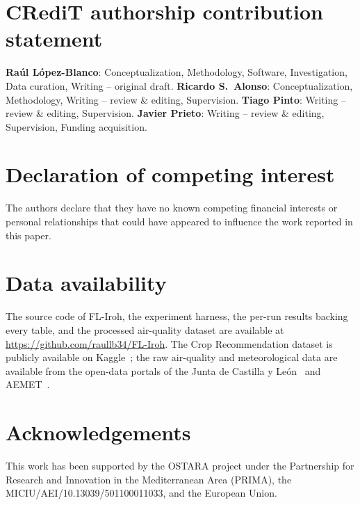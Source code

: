 \documentclass[a4paper,fleqn]{cas-dc}
\begin{document}
\section*{CRediT authorship contribution statement}
\textbf{Ra\'ul L\'opez-Blanco}: Conceptualization, Methodology, Software, Investigation, Data curation, Writing -- original draft. \textbf{Ricardo S.~Alonso}: Conceptualization, Methodology, Writing -- review \& editing, Supervision. \textbf{Tiago Pinto}: Writing -- review \& editing, Supervision. \textbf{Javier Prieto}: Writing -- review \& editing, Supervision, Funding acquisition.

\section*{Declaration of competing interest}
The authors declare that they have no known competing financial interests or personal relationships that could have appeared to influence the work reported in this paper.

\section*{Data availability}
The source code of FL-Iroh, the experiment harness, the per-run results backing every table, and the processed air-quality dataset are available at \url{https://github.com/raullb34/FL-Iroh}. The Crop Recommendation dataset is publicly available on Kaggle~\cite{cropdataset}; the raw air-quality and meteorological data are available from the open-data portals of the Junta de Castilla y Le\'on~\cite{cyl2023airquality} and AEMET~\cite{aemet2023}.

\section*{Acknowledgements}
This work has been supported by the OSTARA project under the Partnership for Research and Innovation in the Mediterranean Area (PRIMA), the MICIU/AEI/10.13039/501100011033, and the European Union.
\end{document}
